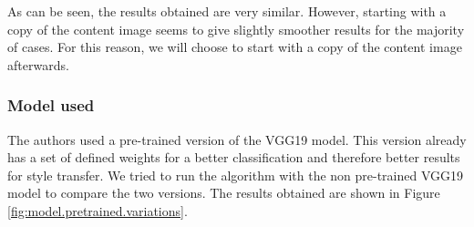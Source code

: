 \documentclass[twocolumn,superscriptaddress,aps,floatfix,nofootinbib]{revtex4-1}
\begin{document}
    As can be seen, the results obtained are very similar. However, starting with a copy of the content image seems to give slightly smoother results for the majority of cases. For this reason, we will choose to start with a copy of the content image afterwards.
    
    \subsubsection{Model used}
    
    The authors used a pre-trained version of the VGG19 model. This version already has a set of defined weights for a better classification and therefore better results for style transfer. We tried to run the algorithm with the non pre-trained VGG19 model to compare the two versions. The results obtained are shown in Figure \ref{fig:model.pretrained.variations}.
    
\end{document}
